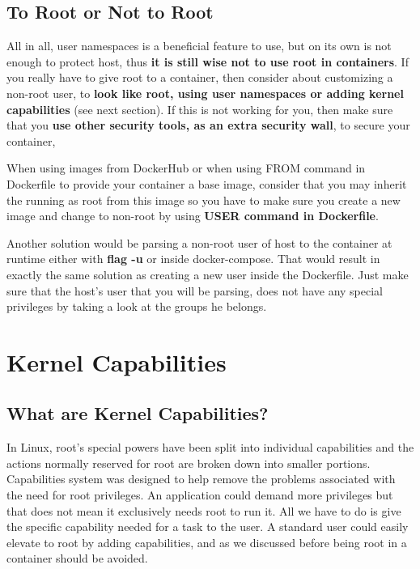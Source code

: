 \subsection{To Root or Not to Root}
All in all, user namespaces is a beneficial feature to use, but on its own is not enough to protect host, thus \textbf{it is still wise not to use root in containers}. If you really have to give root to a container, then consider about customizing a non-root user, to \textbf{look like root, using user namespaces or adding kernel capabilities} (see next section). If this is not working for you, then make sure that you \textbf{use other security tools, as an extra security wall}, to secure your container, 

\begin{mdframed}[backgroundcolor=navajowhite]
When using images from DockerHub or when using FROM command in Dockerfile to provide your container a base image, consider that you may inherit the running as root from this image so you have to make sure you create a new image and change to non-root by using \textbf{USER command in Dockerfile}.

Another solution would be parsing a non-root user of host to the container at runtime either with \textbf{flag -u} or inside docker-compose. That would result in exactly the same solution as creating a new user inside the Dockerfile. Just make sure that the host's user that you will be parsing, does not have any special privileges by taking a look at the groups he belongs.
\end{mdframed}

\section{Kernel Capabilities}
\subsection{What are Kernel Capabilities?}
In Linux, root's special powers have been split into individual capabilities and the actions normally reserved for root are broken down into smaller portions. Capabilities system was designed to help remove the problems associated with the need for root privileges. An application could demand more privileges but that does not mean it exclusively needs root to run it. All we have to do is give the specific capability needed for a task to the user. 
A standard user could easily elevate to root by adding capabilities, and as we discussed before being root in a container should be avoided.

